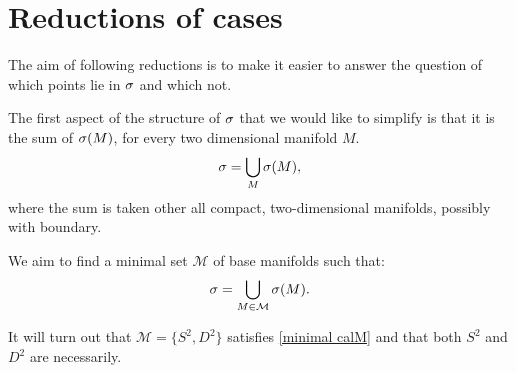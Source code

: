 


\section{Reductions of cases}
The aim of following reductions is to make it easier to answer the question of which 
points lie in ${\sigma}$ and which not. 

The first aspect of the structure of ${\sigma}$ that we would like to simplify is that it is 
the sum of ${{\sigma}(M)}$, for 
every two dimensional manifold $M$. 
\begin{equation}
{\sigma} = \bigcup_{M} {{\sigma}(M)},
\end{equation}
where the sum is taken other all compact, two-dimensional manifolds, possibly with boundary.


We aim to find a minimal set $\mathcal{M}$ of base manifolds 
such that:
\begin{equation}\label{minimal calM}
{\sigma} = \bigcup_{M\in\mathcal{M}}{{\sigma}(M)}.
\end{equation}

It will turn out that $\mathcal{M} = \{S^2, D^2\}$ satisfies \ref{minimal calM} and 
that both $S^2$ and $D^2$ are necessarily. 


